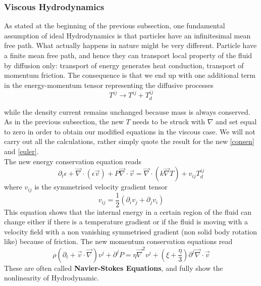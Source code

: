 \documentclass[11pt]{article}
\numberwithin{equation}{section}
\begin{document}
\subsubsection{Viscous Hydrodynamics}

As stated at the beginning of the previous subsection, one fundamental assumption of ideal Hydrodynamics is that particles have an infinitesimal mean free path. What actually happens in nature might be very different. Particle have a finite mean free path, and hence they can transport local property of the fluid by diffusion only: transport of energy generates heat conduction, transport of momentum friction. The consequence is that we end up with one additional term in the energy-momentum tensor representing the diffusive processes
$$
T^{ij} \to T^{ij} + T^{ij}_d 
$$

while the density current remains unchanged because mass is always conserved. As in the previous subsection, the new $T$ needs to be struck with $\nabla$ and set equal to zero in order to obtain our modified equations in the viscous case. We will not carry out all the calculations, rather simply quote the result for the new \ref{consen} and \ref{euler}. \\
The new energy conservation equation reads
$$
\partial_t \epsilon + \vec \nabla \cdot (\epsilon \vec{v}) + P \vec \nabla \cdot \vec{v} = \vec \nabla \cdot (k \vec \nabla T) + v_{ij} T_d^{ij} 
$$
where $v_{ij}$ is the symmetrised velocity gradient tensor
$$
v_{ij} = \frac{1}{2}(\partial_i v_j + \partial_j v_i)
$$
This equation shows that the internal energy in a certain region of the fluid can change either if there is a temperature gradient or if the fluid is moving with a velocity field with a non vanishing symmetrised gradient (non solid body rotation like) because of friction.
The new momentum conservation equations read
$$
\rho \left( \partial_t + \vec{v} \cdot \vec \nabla \right) v^j+\partial^jP = \eta \vec \nabla^2v^j + \left( \xi + \frac{\eta}{3} \right) \partial^j \vec \nabla \cdot \vec{v}
$$
These are often called \textbf{Navier-Stokes Equations}, and fully show the nonlinearity of Hydrodynamic.
\end{document}
